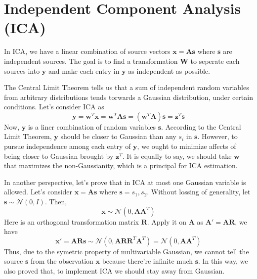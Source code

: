 \documentclass{article}
\begin{document}
\section{Independent Component Analysis (ICA)}
\par
In ICA, we have a linear combination of source vectors $\mathbf{x}=\mathbf{As}$ where $\mathbf{s}$ are independent sources. The goal is to find a transformation $\mathbf{W}$ to seperate each sources into $\mathbf{y}$ and make each entry in $\mathbf{y}$ as independent as possible.
\par
The Central Limit Theorem tells us that a sum of independent random variables from arbitrary distributions tends torwards a Gaussian distribution, under certain conditions.
Let's consider ICA as
\begin{equation}
  \mathbf{y}=\mathbf{w}^T\mathbf{x}=\mathbf{w}^T\mathbf{As}=(\mathbf{w}^T\mathbf{A})\mathbf{s}=\mathbf{z}^T\mathbf{s}
\end{equation}
Now, $\mathbf{y}$ is a liner combination of random variables $\mathbf{s}$. According to the Central Limit Theorem, $\mathbf{y}$ should be closer to Gaussian than any $s_i$ in $\mathbf{s}$. However, to pursue independence among each entry of $\mathbf{y}$,
we ought to minimize affects of being closer to Gaussian brought by $\mathbf{z}^T$. It is equally to say, we should take $\mathbf{w}$ that maximizes the non-Gaussianity, which is a principal for ICA estimation.
\par
In another perspective, let's prove that in ICA at most one Gaussian variable is allowed. Let's consider $\mathbf{x}=\mathbf{As}$ where $\mathbf{s}={s_1,s_2}$. Without lossing of generality, let $\mathbf{s}\sim\mathcal{N}(0, I)$. Then, 
\begin{equation}
  \mathbf{x}\sim\mathcal{N}(0, \mathbf{AA}^T)
\end{equation}
Here is an orthogonal transformation matrix $\mathbf{R}$. Apply it on $\mathbf{A}$ as $\mathbf{A'}=\mathbf{AR}$, we have
\begin{equation}
  \mathbf{x'}=\mathbf{ARs}\sim\mathcal{N}(0, \mathbf{AR}\mathbf{R}^T\mathbf{A}^T)=\mathcal{N}(0, \mathbf{AA}^T)
\end{equation}
Thus, due to the symetric property of multivariable Gaussian, we cannot tell the source $\mathbf{s}$ from the observation $\mathbf{x}$ because there're infinite much $\mathbf{s}$. In this way, we also proved that, to implement ICA we should stay away from Gaussian.
\end{document}
